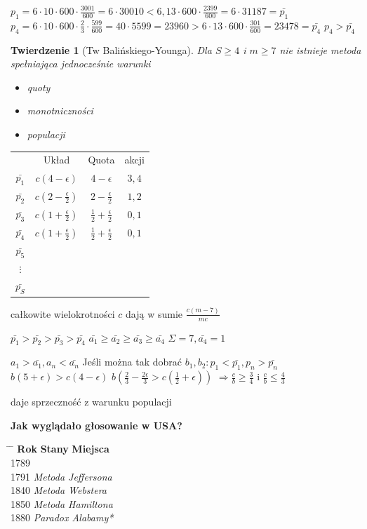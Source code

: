 \documentclass[12pt,a4paper]{article}
\theoremstyle{break}
\newtheorem{theorem}{Twierdzenie}[section]
\begin{document}
	$p_1=6\cdot10\cdot600\cdot\frac{3001}{600}=6\cdot30010<6,13\cdot600\cdot\frac{2399}{600}=6\cdot31187=\bar{p_1}$
	$p_4=6\cdot10\cdot600\cdot\frac{2}{3}\cdot\frac{599}{600}=40\cdot5599=23960>6\cdot13\cdot600\cdot\frac{301}{600}=23478=\bar{p_4}$
	$p_4>\bar{p_4}$
	
	\begin{theorem}[Tw Balińskiego-Younga]
		Dla $S\geq 4$ i $m\geq 7$ nie istnieje metoda spełniająca jednocześnie warunki \begin{itemize}
			\item quoty
			\item monotniczności
			\item populacji
		\end{itemize}
	\end{theorem}
	
	\begin{tabular}{c|c|c|c}
		&Układ&Quota&akcji\\
		$\bar{p_1}$&$c(4-\epsilon)$&$4-\epsilon$&$3,4$\\
		$\bar{p_2}$&$c(2-\frac{\epsilon}{2})$&$2-\frac{\epsilon}{2}$&$1,2$\\
		$\bar{p_3}$&$c(1+\frac{\epsilon}{2})$&$\frac{1}{2}+\frac{\epsilon}{2}$&$0,1$\\
		$\bar{p_4}$&$c(1+\frac{\epsilon}{2})$&$\frac{1}{2}+\frac{\epsilon}{2}$&$0,1$\\
		$\bar{p_5}$&&&\\
		$\vdots$&&&\\
		$\bar{p_S}$&&&\\
	\end{tabular}
	całkowite wielokrotności $c$ dają w sumie $\frac{c(m-7)}{mc}$
	
	$\bar{p_1}>\bar{p_2}>\bar{p_3}>\bar{p_4}$
	$\bar{a_1}\geq\bar{a_2}\geq\bar{a_3}\geq\bar{a_4}$
	$\Sigma = 7,\bar{a_4}=1$
	
	$a_1>\bar{a_1}, a_n<\bar{a_n}$
	Jeśli można tak dobrać $b_1, b_2: p_1<\bar{p_1}, p_n>\bar{p_n}$
	$b(5+\epsilon)>c(4-\epsilon)$
	$b(\frac{2}{3}-\frac{2\epsilon}{3}>c(\frac{1}{2}+\epsilon))$
	$\Rightarrow \frac{c}{b}\geq \frac{3}{4}$ i $\frac{c}{b}\leq \frac{4}{3}$
	
	daje sprzeczność z warunku populacji
	 
	
	\vspace{3cm}
	
	
	\noindent \textbf{Jak wyglądało głosowanie w USA?}
	
	\begin{tabbing}
		\hspace{4cm} \= \hspace{3cm} \= \kill
		\textbf{Rok} \> \textbf{Stany} \> \textbf{Miejsca} \\
		1789   \\
		1791   \quad \textit{Metoda Jeffersona} \\
		1840 \>  \quad \textit{Metoda Webstera} \\
		1850 \>  \quad \textit{Metoda Hamiltona} \\
		1880 \>  \quad \textit{Paradox Alabamy*} \\
	\end{tabbing}
	
\end{document}
